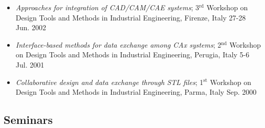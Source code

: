 \documentclass[11pt]{article}
\begin{document}
\begin{itemize}
	\item \emph{Approaches for integration of CAD/CAM/CAE systems}; 3$^\text{rd}$ Workshop on Design Tools and Methods in Industrial Engineering, Firenze, Italy \hfill 27-28 Jun. 2002
	\item \emph{Interface-based methods for data exchange among CAx systems}; 2$^\text{nd}$ Workshop on Design Tools and Methods in Industrial Engineering, Perugia, Italy \hfill 5-6 Jul. 2001
	\item \emph{Collaborative design and data exchange through STL files}; 1$^\text{st}$ Workshop on Design Tools and Methods in Industrial Engineering, Parma, Italy \hfill Sep. 2000
\end{itemize}

\subsection*{Seminars}
\end{document}
